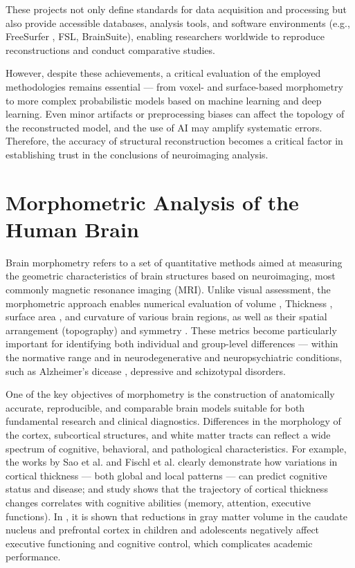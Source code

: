 \documentclass[default]{subfiles}
\begin{document}
These projects not only define standards for data acquisition and processing but also provide accessible databases,
analysis tools, and software environments (e.g., FreeSurfer \cite{caser_2024}, FSL, BrainSuite), enabling researchers
worldwide to reproduce reconstructions and conduct comparative studies.

However, despite these achievements, a critical evaluation of the employed methodologies remains essential — from
voxel- and surface-based morphometry to more complex probabilistic models based on machine learning and deep learning.
Even minor artifacts or preprocessing biases can affect the topology of the reconstructed model, and the use of AI may
amplify systematic errors. Therefore, the accuracy of structural reconstruction becomes a critical factor in
establishing trust in the conclusions of neuroimaging analysis.

\section{Morphometric Analysis of the Human Brain}

Brain morphometry refers to a set of quantitative methods aimed at measuring the geometric characteristics of brain
structures based on neuroimaging, most commonly magnetic resonance imaging (MRI). Unlike visual assessment, the
morphometric approach enables numerical evaluation of volume \cite{upadhyay_2014, fischl_2012, wang_2019, makris_2006},
Thickness \cite{upadhyay_2014, fischl_2000, fischl_2012, wang_2019, makris_2006}, surface area
\cite{desikan_2006, fischl_2012, fischl_2004, wang_2019, makris_2006}, and curvature
\cite{fischl_2012, fischl_2000, wang_2019, makris_2006} of various brain regions, as well as their spatial arrangement
(topography) \cite{desikan_2006, fischl_2008, fischl_1999, wang_2019} and symmetry
\cite{desikan_2006, greve_2013, fischl_2004, wang_2019}. These metrics \cite{klein_2017} become particularly
important for identifying both individual and group-level differences — within the normative range and in
neurodegenerative and neuropsychiatric conditions, such as Alzheimer's dicease \cite{he_2024}, depressive
\cite{van_2013} and schizotypal disorders.

One of the key objectives of morphometry is the construction of anatomically accurate, reproducible, and comparable
brain models suitable for both fundamental research and clinical diagnostics. Differences in the morphology of the
cortex, subcortical structures, and white matter tracts can reflect a wide spectrum of cognitive, behavioral, and
pathological characteristics. For example, the works by Sao et al. \cite{cao_2023} and Fischl et al. \cite{fischl_2000}
clearly demonstrate how variations in cortical thickness — both global and local patterns — can predict cognitive
status and disease; and study \cite{shaw_2006} shows that the trajectory of cortical thickness changes correlates with
cognitive abilities (memory, attention, executive functions). In \cite{jagger_2018}, it is shown that reductions in
gray matter volume in the caudate nucleus and prefrontal cortex in children and adolescents negatively affect executive
functioning and cognitive control, which complicates academic performance.
\end{document}
